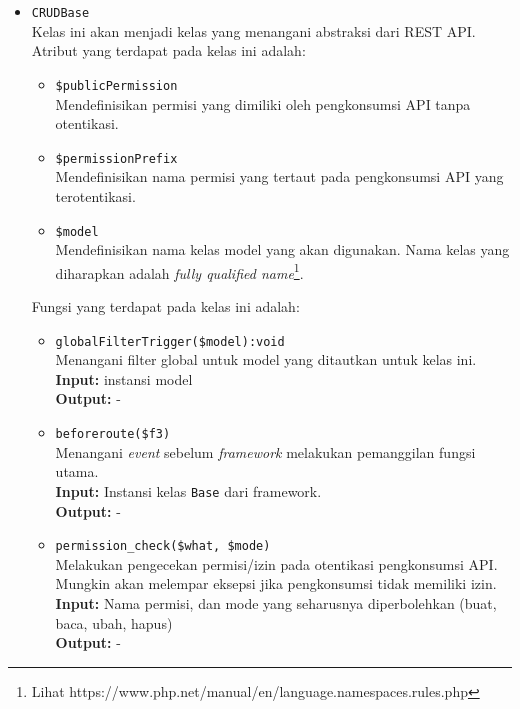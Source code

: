 \begin{itemize}
        \item  \texttt{CRUDBase} \\
            Kelas ini akan menjadi kelas yang menangani abstraksi dari REST API.
            Atribut yang terdapat pada kelas ini adalah:
            \begin{itemize}
                \item \texttt{\$publicPermission}\\
                    Mendefinisikan permisi yang dimiliki oleh
                    pengkonsumsi API tanpa otentikasi.
                \item \texttt{\$permissionPrefix}\\
                    Mendefinisikan nama permisi yang tertaut pada
                    pengkonsumsi API yang terotentikasi.
                \item \texttt{\$model}\\
                    Mendefinisikan nama kelas model yang akan digunakan. Nama
                    kelas yang diharapkan adalah \textit{fully qualified name}\footnote{Lihat
                    https://www.php.net/manual/en/language.namespaces.rules.php}.
            \end{itemize}
            Fungsi yang terdapat pada kelas ini adalah:
            \begin{itemize}
                \item \texttt{globalFilterTrigger(\$model):void} \\
                    Menangani filter global untuk model yang ditautkan untuk kelas ini. \\
                    \textbf{Input:} instansi model\\
                    \textbf{Output:} -\\
                
                \item \texttt{beforeroute(\$f3)}\\
                    Menangani \textit{event} sebelum \textit{framework} melakukan pemanggilan
                    fungsi utama.\\
                    \textbf{Input:} Instansi kelas \texttt{Base} dari framework.\\
                    \textbf{Output:} -\\
                    
                \item \texttt{permission\_check(\$what, \$mode)} \\
                    Melakukan pengecekan permisi/izin pada otentikasi pengkonsumsi API.
                    Mungkin akan melempar eksepsi jika pengkonsumsi tidak memiliki izin.\\
                    \textbf{Input:} Nama permisi, dan mode yang seharusnya diperbolehkan
                        (buat, baca, ubah, hapus)\\
                    \textbf{Output:} -\\
                

\end{itemize}
\end{itemize}
